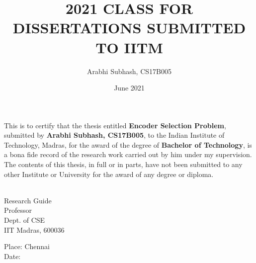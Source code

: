 \documentclass[BTech,thesis]{iitmdiss}
\begin{document}


\title{2021 CLASS FOR DISSERTATIONS SUBMITTED TO IITM}

\author{Arabhi Subhash, CS17B005}

\date{June 2021}

\begin{singlespace}
\maketitle 
\end{singlespace} 



\certificate

\vspace*{0.5in}

\noindent This is to certify that the thesis entitled {\bf Encoder Selection Problem}, 
submitted by {\bf Arabhi Subhash, CS17B005}, to the Indian Institute of Technology, 
Madras, for the award of the degree of {\bf Bachelor of Technology}, 
is a bona fide record of the research work carried out by him under my
supervision. The contents of this thesis, in full or in parts, have not been
submitted to any other Institute or University for the award of any degree or
diploma.

\vspace*{1.4in}
\hspace*{-0.25in}
\begin{singlespacing}
	\hspace*{-0.25in}
	\parbox{2.5in}{
		 \\
		\noindent Research Guide \\ 
		\noindent Professor \\
		\noindent Dept. of CSE\\
		\noindent IIT Madras, 600036 \\
	} 
	\hspace*{1.0in} 
\end{singlespacing}
\vspace*{0.25in}
\noindent Place: Chennai\\
Date: 
\end{document}
